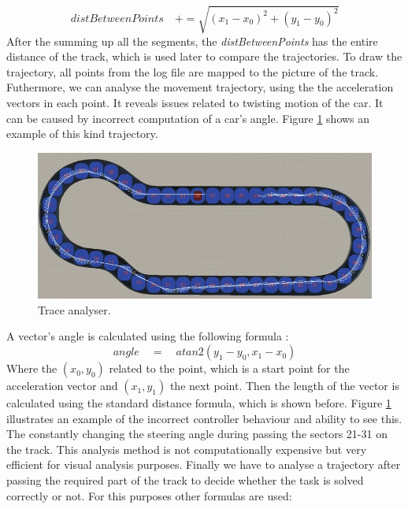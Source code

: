 \begin{equation}
    distBetweenPoints\quad+= \sqrt{(x_1-x_0)^2 + (y_1-y_0)^2}
\end{equation}
After the summing up all the segments, the \textit{distBetweenPoints} has the entire distance of the track, which is used later to compare the trajectories. To draw the trajectory, all points from the log file are mapped to the picture of the track.\newline
Futhermore, we can analyse the movement trajectory, using the the acceleration vectors in each point. It reveals issues related to twisting motion of the car. It can be caused by incorrect computation of a car's angle. Figure \ref{fig:trajectory-acc} shows an example of this kind trajectory.\newline
\begin{figure}[h!]
    \centering
    \includegraphics[width=\linewidth]{src/pic/trajectory-acceleration}
    \caption{Trace analyser.}
    \label{fig:trajectory-acc}
\end{figure}\newline
A vector's angle is calculated using the following formula \cite{Atan2}:
\begin{equation}
    angle\quad=\quad atan2(y_1 - y_0, x_1 -x_0) 
\end{equation}
Where the $(x_0, y_0)$ related to the point, which is a start point for the acceleration vector and $(x_1, y_1)$ the next point. Then the length of the vector is calculated using the standard distance formula, which is shown before. Figure \ref{fig:trajectory-acc} illustrates an example of the incorrect controller behaviour and ability to see this. The constantly changing the steering angle during passing the sectors 21-31 on the track. This analysis method is not computationally expensive but very efficient for visual analysis purposes.\newline
Finally we have to analyse a trajectory after passing the required part of the track to decide whether the task is solved correctly or not. For this purposes other formulas are used:
